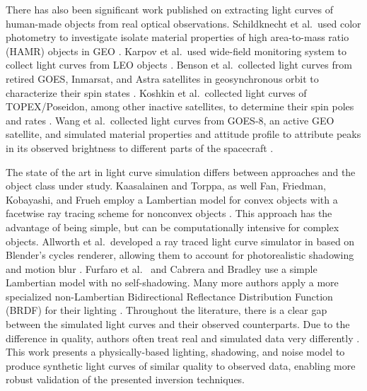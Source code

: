 There has also been significant work published on extracting light curves of human-made objects from real optical observations. Schildknecht et al.\ used color photometry to investigate isolate material properties of high area-to-mass ratio (HAMR) objects in GEO \cite{schildknecht2008}. Karpov et al.\ used wide-field monitoring system to collect light curves from LEO objects \cite{karpov2016}. Benson et al.\ collected light curves from retired GOES, Inmarsat, and Astra satellites in geosynchronous orbit to characterize their spin states \cite{benson2017}. Koshkin et al.\ collected light curves of TOPEX/Poseidon, among other inactive satellites, to determine their spin poles and rates \cite{koshkin2018}. Wang et al.\ collected light curves from GOES-8, an active GEO satellite, and simulated material properties and attitude profile to attribute peaks in its observed brightness to different parts of the spacecraft \cite{wang2018}.

The state of the art in light curve simulation differs between approaches and the object class under study. Kaasalainen and Torppa, as well Fan, Friedman, Kobayashi, and Frueh employ a Lambertian model for convex objects with a facetwise ray tracing scheme for nonconvex objects \cite{kaasalainen2001, fan2016, fan2020thesis,friedman2020,kobayashi2020,frueh2014}. This approach has the advantage of being simple, but can be computationally intensive for complex objects. Allworth et al.\ developed a ray traced light curve simulator in based on Blender's cycles renderer, allowing them to account for photorealistic shadowing and motion blur \cite{allworth2020, allworth2021}. Furfaro et al.\ \cite{furfaro2019} and Cabrera and Bradley \cite{cabrera2021,bradley2014} use a simple Lambertian model with no self-shadowing. Many more authors apply a more specialized non-Lambertian Bidirectional Reflectance Distribution Function (BRDF) for their lighting \cite{linares2018space, mcnally2021, blacketer2022}. Throughout the literature, there is a clear gap between the simulated light curves and their observed counterparts. Due to the difference in quality, authors often treat real and simulated data very differently \cite{allworth2021}. This work presents a physically-based lighting, shadowing, and noise model to produce synthetic light curves of similar quality to observed data, enabling more robust validation of the presented inversion techniques.


